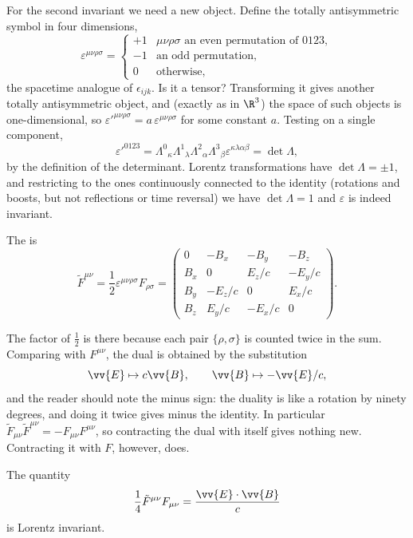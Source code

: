 For the second invariant we need a new object. Define the totally antisymmetric symbol in four dimensions,
$$
\varepsilon^{\mu\nu\rho\sigma} = \begin{cases} +1 & \mu\nu\rho\sigma \text{ an even permutation of } 0123,\\ -1 & \text{an odd permutation},\\ 0&\text{otherwise},\end{cases}
$$
the spacetime analogue of $\epsilon_{ijk}$. Is it a tensor? Transforming it gives another totally antisymmetric object, and (exactly as in $\R^3$) the space of such objects is one-dimensional, so $\varepsilon'^{\mu\nu\rho\sigma} = a\,\varepsilon^{\mu\nu\rho\sigma}$ for some constant $a$. Testing on a single component,
$$
\varepsilon'^{0123} = \Lambda^0{}_\kappa \Lambda^1{}_\lambda\Lambda^2{}_\alpha\Lambda^3{}_\beta \varepsilon^{\kappa\lambda\alpha\beta} = \det \Lambda,
$$
by the definition of the determinant. Lorentz transformations have $\det\Lambda = \pm 1$, and restricting to the ones continuously connected to the identity (rotations and boosts, but not reflections or time reversal) we have $\det\Lambda = 1$ and $\varepsilon$ is indeed invariant.

\begin{definition}
	The  is
	$$
	\tilde F^{\mu\nu} = \frac{1}{2}\varepsilon^{\mu\nu\rho\sigma}F_{\rho\sigma} = \begin{pmatrix} 0 & -B_x & -B_y & -B_z\\ B_x & 0 & E_z/c & -E_y/c\\ B_y & -E_z/c & 0 & E_x/c\\ B_z & E_y/c & -E_x/c & 0\end{pmatrix}.
	$$
\end{definition}

The factor of $\tfrac12$ is there because each pair $\{\rho,\sigma\}$ is counted twice in the sum. Comparing with $F^{\mu\nu}$, the dual is obtained by the substitution
$$
\vv{E} \mapsto c\vv{B}, \qquad \vv{B}\mapsto -\vv{E}/c,
$$
and the reader should note the minus sign: the duality is like a rotation by ninety degrees, and doing it twice gives minus the identity. In particular $\tilde F_{\mu\nu}\tilde F^{\mu\nu} = -F_{\mu\nu}F^{\mu\nu}$, so contracting the dual with itself gives nothing new. Contracting it with $F$, however, does.

\begin{proposition}
	The quantity
	$$
	\frac{1}{4}\tilde F^{\mu\nu}F_{\mu\nu} = \frac{\vv{E}\cdot\vv{B}}{c}
	$$
	is Lorentz invariant.
\end{proposition}

